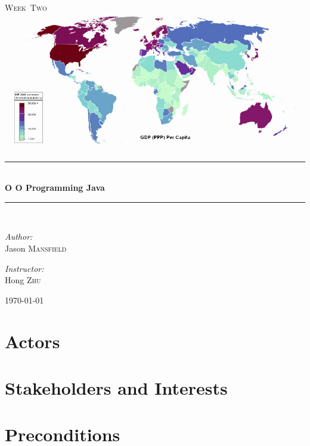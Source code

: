 \documentclass[11pt,a4paper]{article}
\newcommand{\HRule}{\rule{\linewidth}{0.5mm}}
\begin{document}
%
\begin{titlepage}
\begin{center}


\textsc{\color{Sepia}{\LARGE CS~434}}\\[1.5cm]
\textsc{\Large Week~Two}\\[0.5cm]
\includegraphics[scale=0.5]{GDP}\\
\HRule \\[0.4cm]
{ \huge \bfseries O O Programming Java}\\[0.4cm]
\HRule \\[1.5cm]


\begin{minipage}{0.4\textwidth}
\begin{flushleft} \large
\emph{Author:}\\
Jason \textsc{Mansfield}
\end{flushleft}
\end{minipage}
\begin{minipage}{0.4\textwidth}
\begin{flushright} \large
\emph{Instructor:} \\
Hong \textsc{Zhu}
\end{flushright}
\end{minipage}
\vfill
{\large \today}
\end{center}
\end{titlepage}
\tableofcontents
\section{Actors}
\section{Stakeholders and Interests}
\section{Preconditions}
\end{document}
